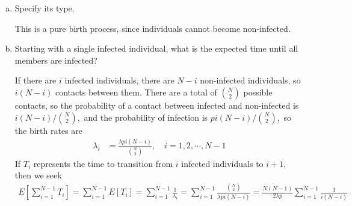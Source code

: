 \documentclass{article}
\begin{document}
\begin{itemize}
\begin{enumerate}[(a)]
			\item Specify its type.
				\begin{answer*}
					This is a pure birth process, since individuals cannot become non-infected.
				\end{answer*}

			\item Starting with a single infected individual, what is the expected time until all members are infected?
				\begin{soln}
					If there are $i$ infected individuals, there are $N-i$ non-infected individuals, so $i(N-i)$ contacts between them. There are a total of $\binom{N}{2}$ possible contacts, so the probability of a contact between infected and non-infected is $i(N-i)/\binom{N}{2},$ and the probability of infection is $pi(N-i)/\binom{N}{2},$ so the birth rates are
					\begin{align*}
						\lambda_i &= \frac{\lambda p i(N-i)}{\binom{N}{2}}, \quad i=1, 2, \cdots, N-1
					\end{align*}
					If $T_i$ represents the time to transition from $i$ infected individuals to $i+1,$ then we seek
					\begin{align*}
						E\left[ \sum_{i=1}^{N-1} T_i \right] = \sum_{i=1}^{N-1} E[T_i] = \sum_{i=1}^{N-1} \frac{1}{\lambda_i} = \sum_{i=1}^{N-1} \frac{\binom{N}{2}}{\lambda pi(N-i)} = \frac{N(N-1)}{2\lambda p}\sum_{i=1}^{N-1} \frac{1}{i(N-i)}
					\end{align*}
				\end{soln}

		\end{enumerate}


\end{itemize}
\end{document}
